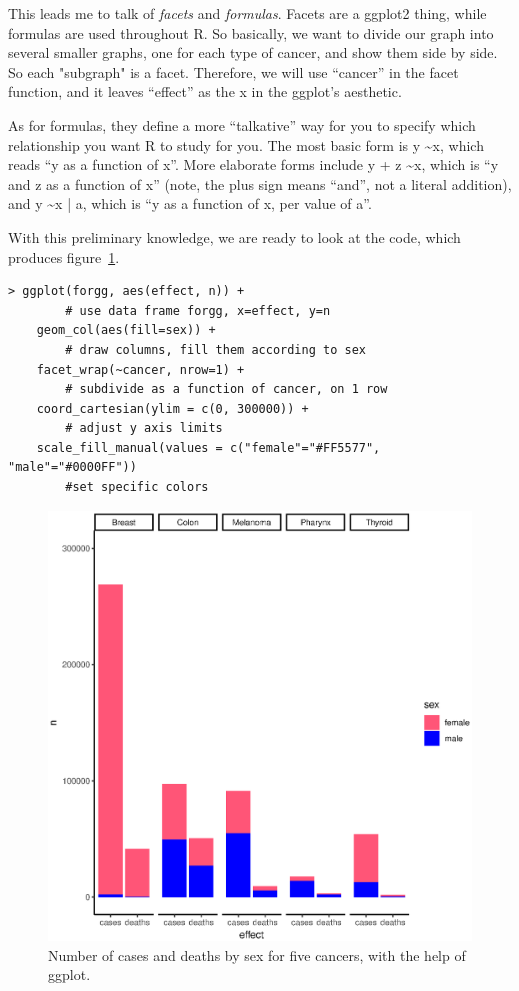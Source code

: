 \documentclass{report}
\newcommand{\code}[1]{\textsf{\ttfamily #1}}
\begin{document}
	This leads me to talk of \emph{facets} and \emph{formulas}. Facets are a \code{ggplot2} thing, while formulas are used throughout R. So basically, we want to divide our graph into several smaller graphs, one for each type of cancer, and show them side by side. So each "subgraph" is a facet. Therefore, we will use ``cancer'' in the facet function, and it leaves ``effect'' as the x in the \code{ggplot}'s aesthetic.
	
	As for formulas, they define a more ``talkative'' way for you to specify which relationship you want R to study for you. The most basic form is \code{y \textasciitilde x}, which reads ``y as a function of x''. More elaborate forms include \code{y + z \textasciitilde x}, which is ``y and z as a function of x'' (note, the plus sign means ``and'', not a literal addition), and \code{y \textasciitilde x | a}, which is ``y as a function of x, per value of a''.
	
	With this preliminary knowledge, we are ready to look at the code, which produces figure~\ref{fig:ggplot}.
	\begin{verbatim}
> ggplot(forgg, aes(effect, n)) +		
		# use data frame forgg, x=effect, y=n
	geom_col(aes(fill=sex)) +		
		# draw columns, fill them according to sex
	facet_wrap(~cancer, nrow=1) +	
		# subdivide as a function of cancer, on 1 row
	coord_cartesian(ylim = c(0, 300000)) +	
		# adjust y axis limits
	scale_fill_manual(values = c("female"="#FF5577", "male"="#0000FF"))
		#set specific colors
	\end{verbatim}
	\begin{figure}[h]
		\centering
		\includegraphics[width=1.0\textwidth]{ggplot.eps}
		\caption{Number of cases and deaths by sex for five cancers, with the help of \code{ggplot}.}
		\label{fig:ggplot}
	\end{figure}
	
\end{document}
